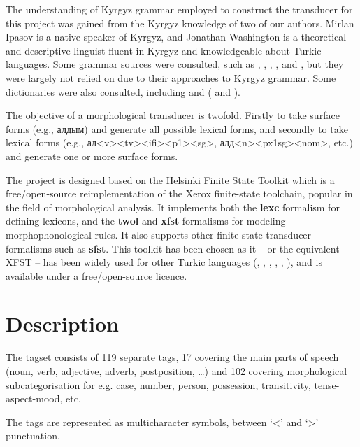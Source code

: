 \documentclass[a4paper,12pt,onecolumn,oneside]{article}
\newcommand{\citemultileft}[1]{(\citeauthor{#1}, \citeyear{#1}}
\newcommand{\citemultimid}[1]{\citeauthor{#1}, \citeyear{#1}}
\newcommand{\citemultiright}[1]{\citeauthor{#1}, \citeyear{#1})}
\newcommand{\citetwoyears}[2]{\citeauthor{#1} (\citeyear{#1} and \citeyear{#2})}
\begin{document}
The understanding of Kyrgyz grammar employed to construct the transducer for this project was gained from the Kyrgyz knowledge of two of our authors.  Mirlan Ipasov is a native speaker of Kyrgyz, and Jonathan Washington is a theoretical and descriptive linguist fluent in Kyrgyz and knowledgeable about Turkic languages.  Some grammar sources were consulted, such as \citet{hebertpoppe1963}, \citet{usonalievomuraliev2003}, \citet{qudaybergenov1980}, \citet{somfaikara2003}, and \citet{imart1981}, but they were largely not relied on due to their approaches to Kyrgyz grammar.  Some dictionaries were also consulted, including \citet{jumakunova2005} and \citetwoyears{yudakhin1957}{yudakhin1965}.

The objective of a morphological transducer is twofold. Firstly to take surface forms (e.g., алдым) and generate all possible lexical forms, and secondly to take lexical forms (e.g.,  ал<v><tv><ifi><p1><sg>, алд<n><px1sg><nom>, etc.) and generate one or more surface forms. 


The project is designed based on the Helsinki Finite State Toolkit \citep{linden2011} which is a free/open-source reimplementation of the Xerox finite-state toolchain, popular in the field of morphological analysis. It implements both the \textbf{lexc} formalism for defining lexicons, and the \textbf{twol} and \textbf{xfst} formalisms for modeling morphophonological rules. It also supports other finite state transducer formalisms such as \textbf{sfst}. This toolkit has been chosen as it -- or the equivalent XFST -- has been widely used for other Turkic languages \citemultileft{coltekin2010}, \citemultimid{altinasi2001}, \citemultiright{tantug2006}, and is available under a free/open-source licence.

\section{Description}
The tagset consists of 119 separate tags, 17 covering the main parts of speech (noun, verb, adjective, adverb, postposition, \ldots{}) and 102 covering morphological subcategorisation for e.g. case, number, person, possession, transitivity, tense-aspect-mood, etc.

The tags are represented as multicharacter symbols, between `<' and `>' punctuation.
\end{document}
